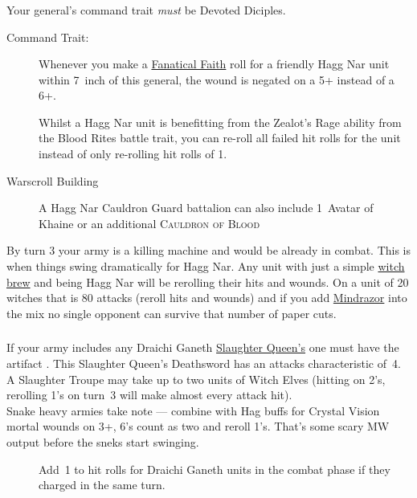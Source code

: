 \subsubsection{}
Your general's command trait \emph{must} be Devoted Diciples.
\begin{description} 
    \item [Command Trait: ]
        Whenever you make a \hyperref[fanatical-faith]{Fanatical Faith} roll
        for a friendly Hagg Nar unit within 7~inch of this general, the
        wound is negated on a 5+ instead of a 6+.  
    \item [] Whilst a Hagg
        Nar unit is benefitting from the Zealot's Rage ability from the Blood
        Rites battle trait, you can re-roll all failed hit rolls for the unit
        instead of only re-rolling hit rolls of 1.
    \item [Warscroll Building] A Hagg Nar Cauldron Guard battalion can
        also include 1~Avatar of Khaine or an additional
        \textsc{Cauldron of Blood}
\end{description}
By turn 3 your army is a killing machine and would be already in combat. This is
when things swing dramatically for Hagg Nar. Any unit with just a simple
\hyperref[witchbrew]{witch brew} and being Hagg Nar will be rerolling their
hits and wounds. On a unit of 20 witches that is 80 attacks (reroll hits and
wounds) and if you add \hyperref[mindrazor]{Mindrazor} into the mix no single opponent
can survive that number of paper cuts. 

\subsubsection{}
If your army includes any Draichi Ganeth \hyperref[slaughter-queen]{Slaughter
Queen's} one must have the artifact \textbf{}. This Slaughter
Queen's Deathsword has an attacks characteristic of~4. A Slaughter Troupe
may take up to two units of Witch Elves (hitting on 2's, rerolling 1's on turn~3
will make almost every attack hit).\\
Snake heavy armies take note --- combine
with Hag buffs for Crystal Vision mortal wounds on 3+, 6's count as two and
reroll 1's. That's some scary MW output before the sneks start swinging.
\begin{description}
    \item [] Add~1 to hit rolls for Draichi
    Ganeth units in the combat phase if they charged in the same turn.
\end{description}

